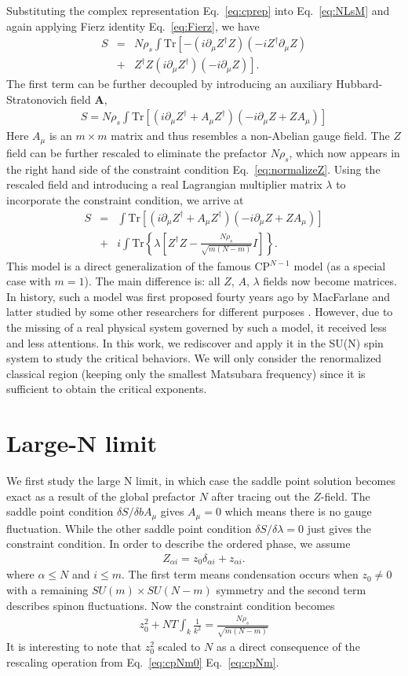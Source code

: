 \documentclass[aps,twocolumn,superscriptaddress]{revtex4-1}
\newcommand{\bea}{\begin{eqnarray}}
\newcommand{\eea}{\end{eqnarray}}
\newcommand{\bA}{\mathbf{A}}
\begin{document}
Substituting the complex representation Eq.~\ref{eq:cprep} into Eq.~\ref{eq:NLsM} and again applying Fierz identity
Eq.~\ref{eq:Fierz}, we have \bea S &=& N\rho_s \int\mathrm{Tr}\left[-(i\partial_\mu Z^\dagger Z) (-iZ^\dag \partial_\mu
Z) \right. \nonumber\\  &+& \left. Z^\dag Z (i\partial_\mu Z^\dagger)(-i\partial_\mu Z)\right] .\eea The first term can
be further decoupled by introducing an auxiliary Hubbard-Stratonovich field $\bA$, \bea \label{eq:cpNm0} S=N\rho_s\int
\mathrm{Tr}\left[ (i\partial_\mu Z^\dag+A_\mu Z^\dag)(-i\partial_\mu Z+ZA_\mu)  \right] \eea Here $A_\mu$ is an $m\times
m$ matrix and thus resembles a non-Abelian gauge field. The $Z$ field can be further rescaled to eliminate the prefactor
$N\rho_s$, which now appears in the right hand side of the constraint condition Eq.~\ref{eq:normalizeZ}. Using the
rescaled field and introducing a real Lagrangian multiplier matrix $\lambda$ to incorporate the constraint condition, we
arrive at \bea \label{eq:cpNm} S&=&\int \mathrm{Tr}\left[ (i\partial_\mu Z^\dag+A_\mu Z^\dag)(-i\partial_\mu Z+ZA_\mu)
\right] \nonumber \\ &+& i\int \mathrm{Tr}\left\{\lambda\left[Z^\dag Z-\frac{N\rho_s}{\sqrt{m(N-m)}}I\right]\right\} .
\eea This model is a direct generalization of the famous CP$^{N-1}$ model (as a special case with $m=1$). The main
difference is: all $Z$, $A$, $\lambda$ fields now become matrices. In history, such a model was first proposed fourty
years ago by MacFarlane \cite{macfarlane1979} and latter studied by some other researchers for different purposes
\cite{hikami1980,duerksen1981,maharana1983}. However, due to the missing of a real physical system governed by such a
model, it received less and less attentions. In this work, we rediscover and apply it in the SU(N) spin system to study
the critical behaviors. We will only consider the renormalized classical region (keeping only the smallest Matsubara
frequency) since it is sufficient to obtain the critical exponents. \cite{irkhin1996}

\section{Large-N limit}
We first study the large N limit, in which case the saddle point solution becomes exact as a result of the global
prefactor $N$ after tracing out the $Z$-field. The saddle point condition $\delta S/\delta bA_\mu$ gives $A_\mu=0$ which
means there is no gauge fluctuation. While the other saddle point condition $\delta S/\delta \lambda=0$ just gives the
constraint condition. In order to describe the ordered phase, we assume \bea Z_{\alpha i}=z_0\delta_{\alpha i}+z_{\alpha
i}. \eea where $\alpha\le N$ and $i\le m$. The first term means condensation occurs when $z_0\ne0$ with a remaining
$SU(m)\times SU(N-m)$ symmetry and the second term describes spinon fluctuations. Now the constraint condition becomes
\bea \label{eq:Ninfty} z_0^2 + NT\int_k \frac{1}{k^2} = \frac{N\rho_s}{\sqrt{m(N-m)}} \eea It is interesting to note
that $z_0^2$ scaled to $N$ as a direct consequence of the rescaling operation from Eq.~\ref{eq:cpNm0} Eq.~\ref{eq:cpNm}. 
\end{document}
